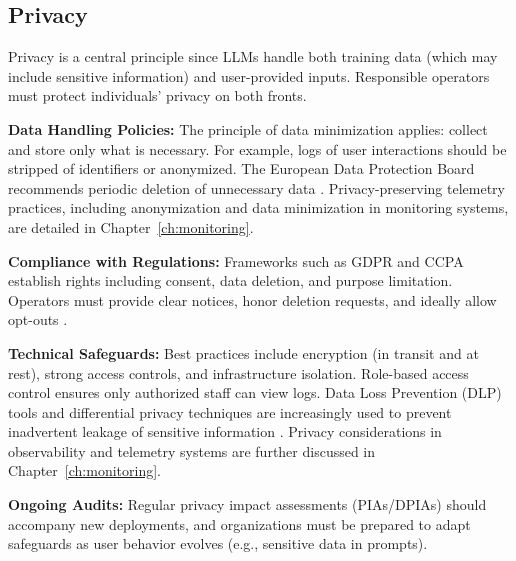 
\subsection{Privacy}

Privacy is a central principle since LLMs handle both training data (which may include sensitive information) and user-provided inputs. Responsible operators must protect individuals' privacy on both fronts.

\textbf{Data Handling Policies:} The principle of data minimization applies: collect and store only what is necessary. For example, logs of user interactions should be stripped of identifiers or anonymized. The European Data Protection Board recommends periodic deletion of unnecessary data \cite{edpb2022}. Privacy-preserving telemetry practices, including anonymization and data minimization in monitoring systems, are detailed in Chapter~\ref{ch:monitoring}.

\textbf{Compliance with Regulations:} Frameworks such as GDPR and CCPA establish rights including consent, data deletion, and purpose limitation. Operators must provide clear notices, honor deletion requests, and ideally allow opt-outs \cite{iapp2023}.

\textbf{Technical Safeguards:} Best practices include encryption (in transit and at rest), strong access controls, and infrastructure isolation. Role-based access control ensures only authorized staff can view logs. Data Loss Prevention (DLP) tools and differential privacy techniques are increasingly used to prevent inadvertent leakage of sensitive information \cite{edpb2022}. Privacy considerations in observability and telemetry systems are further discussed in Chapter~\ref{ch:monitoring}.

\textbf{Ongoing Audits:} Regular privacy impact assessments (PIAs/DPIAs) should accompany new deployments, and organizations must be prepared to adapt safeguards as user behavior evolves (e.g., sensitive data in prompts).

